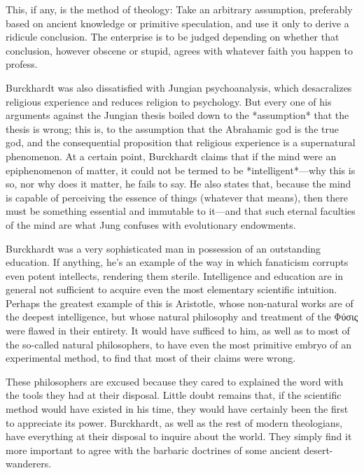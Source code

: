 \documentclass[a4paper, 12pt]{article}
\begin{document}
This, if any, is the method of theology: Take an arbitrary assumption,
preferably based on ancient knowledge or primitive speculation, and use it only
to derive a ridicule conclusion. The enterprise is to be judged depending on
whether that conclusion, however obscene or stupid, agrees with whatever faith
you happen to profess.

Burckhardt was also dissatisfied with Jungian psychoanalysis, which
desacralizes religious experience and reduces religion to psychology. But every
one of his arguments against the Jungian thesis boiled down to the *assumption*
that the thesis is wrong; this is, to the assumption that the Abrahamic god is
the true god, and the consequential proposition that religious experience is a
supernatural phenomenon. At a certain point, Burckhardt claims that if the mind were
an epiphenomenon of matter, it could not be termed to be *intelligent*—why
this is so, nor why does it matter, he fails to say. He also states that,
because the mind is capable of perceiving the essence of things (whatever that
means), then there must be something essential and immutable to it—and that
such eternal faculties of the mind are what Jung confuses with evolutionary
endowments.

Burckhardt was a very sophisticated man in possession of an outstanding
education. If anything, he's an example of the way in
which fanaticism corrupts even potent intellects, rendering them sterile.
Intelligence and education are in general not sufficient to acquire even the
most elementary scientific intuition. Perhaps the greatest example of this is
Aristotle, whose non-natural works are of the deepest intelligence, but whose
natural philosophy and treatment of the Φύσις were flawed in their entirety. It
would have sufficed to him, as well as to most of the so-called natural
philosophers, to have even the most primitive embryo of an experimental method,
to find that most of their claims were wrong. 

These philosophers are excused because they cared to explained the word with
the tools they had at their disposal. Little doubt remains that, if the
scientific method would have existed in his time, they would have certainly
been the first to appreciate its power. Burckhardt, as well as the rest of
modern theologians, have everything at their disposal to inquire about the
world. They simply find it more important to agree with the barbaric doctrines
of some ancient desert-wanderers.
\end{document}
